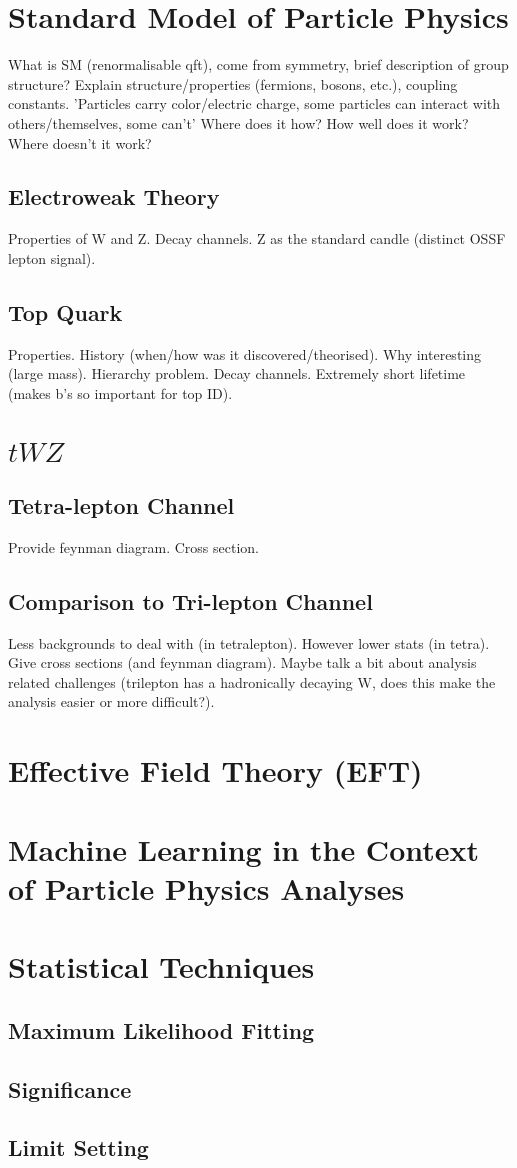 \section{Standard Model of Particle Physics}
What is SM (renormalisable qft), come from symmetry, brief description of group structure? Explain structure/properties (fermions, bosons, etc.), coupling constants. 'Particles carry color/electric charge, some particles can interact with others/themselves, some can't' Where does it how? How well does it work? Where doesn't it work? 
\subsection{Electroweak Theory}
Properties of W and Z. Decay channels. Z as the standard candle (distinct OSSF lepton signal).
\subsection{Top Quark}
Properties. History (when/how was it discovered/theorised). Why interesting (large mass). Hierarchy problem. Decay channels. Extremely short lifetime (makes b's so important for top ID).
\section{$tWZ$}
\subsection{Tetra-lepton Channel}
Provide feynman diagram. Cross section. 

\subsection{Comparison to Tri-lepton Channel}

Less backgrounds to deal with (in tetralepton). However lower stats (in tetra). Give cross sections (and feynman diagram). Maybe talk a bit about analysis related challenges (trilepton has a hadronically decaying W, does this make the analysis easier or more difficult?).

\section{Effective Field Theory (EFT)}
\section{Machine Learning in the Context of Particle Physics Analyses}

\section{Statistical Techniques}
\subsection{Maximum Likelihood Fitting}
\subsection{Significance}
\subsection{Limit Setting} 
